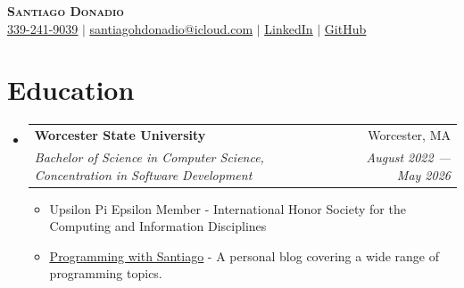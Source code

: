 \documentclass[letterpaper,11pt]{article}
\makeatletter
\newcommand{\resumeItem}[1]{
  \item\small{
    {#1 \vspace{-2pt}}
  }
}
\newcommand{\resumeSubheading}[4]{
  \vspace{-2pt}\item
    \begin{tabular*}{0.97\textwidth}[t]{l@{\extracolsep{\fill}}r}
      \textbf{#1} & #2 \\
      \textit{\small#3} & \textit{\small #4} \\
    \end{tabular*}\vspace{-7pt}
}
\newcommand{\resumeSubHeadingListStart}{\begin{itemize}[leftmargin=0.15in, label={}]}
\newcommand{\resumeSubHeadingListEnd}{\end{itemize}}
\newcommand{\resumeItemListStart}{\begin{itemize}}
\newcommand{\resumeItemListEnd}{\end{itemize}\vspace{-5pt}}
\makeatother
\begin{document}

\begin{center}
    \textbf{\Huge \scshape Santiago Donadio} \\ \vspace{5pt}
    \small \href{sms:3392419039}{\underline{339-241-9039}} $|$ \href{mailto:santiagohdonadio@icloud.com}{\underline{santiagohdonadio@icloud.com}} $|$
    \href{https://www.linkedin.com/in/santiagodonadio/}{\underline{LinkedIn}} $|$
    \href{https://github.com/santiagodonadio/}{\underline{GitHub}} %
\end{center}

\section{Education}
\vspace{7pt}
  \resumeSubHeadingListStart
    \resumeSubheading
      {Worcester State University}{Worcester, MA}
      {Bachelor of Science in Computer Science, Concentration in Software Development}{August 2022 — May 2026}
      
      \resumeItemListStart
        \resumeItem{Upsilon Pi Epsilon Member - International Honor Society for the Computing and Information Disciplines}
        \resumeItem{\href{https://programmingwithsantiago.wordpress.com}{\underline{Programming with Santiago}} - A personal blog covering a wide range of programming topics.}
        
      \resumeItemListEnd
    
    
  \resumeSubHeadingListEnd


\vspace{0pt}
\end{document}

